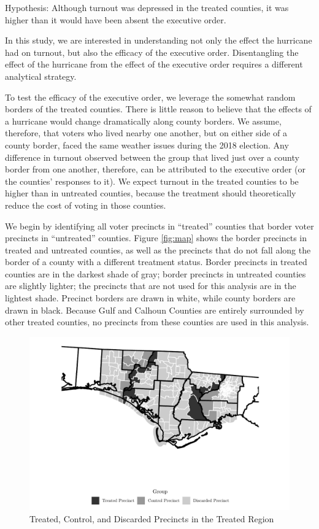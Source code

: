 \documentclass[
  12pt,
]{article}
\begin{document}
Hypothesis: Although turnout was depressed in the treated counties, it was higher than it would have been absent the executive order.

In this study, we are interested in understanding not only the effect the hurricane had on turnout, but also the efficacy of the executive order. Disentangling the effect of the hurricane from the effect of the executive order requires a different analytical strategy.

To test the efficacy of the executive order, we leverage the somewhat random borders of the treated counties. There is little reason to believe that the effects of a hurricane would change dramatically along county borders. We assume, therefore, that voters who lived nearby one another, but on either side of a county border, faced the same weather issues during the 2018 election. Any difference in turnout observed between the group that lived just over a county border from one another, therefore, can be attributed to the executive order (or the counties' responses to it). We expect turnout in the treated counties to be higher than in untreated counties, because the treatment should theoretically reduce the cost of voting in those counties.

We begin by identifying all voter precincts in ``treated'' counties that border voter precincts in ``untreated'' counties. Figure \ref{fig:map} shows the border precincts in treated and untreated counties, as well as the precincts that do not fall along the border of a county with a different treatment status. Border precincts in treated counties are in the darkest shade of gray; border precincts in untreated counties are slightly lighter; the precincts that are not used for this analysis are in the lightest shade. Precinct borders are drawn in white, while county borders are drawn in black. Because Gulf and Calhoun Counties are entirely surrounded by other treated counties, no precincts from these counties are used in this analysis.

\begin{figure}[H]

{\centering \includegraphics{hurricane_michael_files/figure-latex/map-chunk-1} 

}

\caption{\label{fig:map}Treated, Control, and Discarded Precincts in the Treated Region}\label{fig:map-chunk}
\end{figure}
\end{document}
